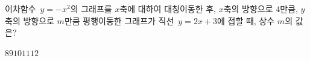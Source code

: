 이차함수~$y=-x^2$의 그래프를 $x$축에 대하여 대칭이동한 후, $x$축의 방향으로 $4$만큼, $y$축의 방향으로 $m$만큼 평행이동한 그래프가 직선~$y=2x+3$에 접할 때, 상수 $m$의 값은?
\begin{choices32}{$8$}{$9$}{$10$}{$11$}{$12$}\end{choices32}

